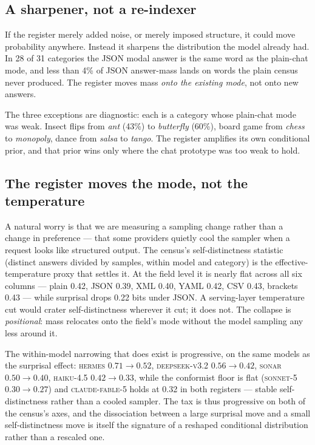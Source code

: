 \documentclass[11pt]{article}
\begin{document}
\subsection{A sharpener, not a re-indexer}
\label{sec:sharpener}
If the register merely added noise, or merely imposed structure, it could move probability
anywhere. Instead it sharpens the distribution the model already had. In 28 of 31 categories the
JSON modal answer is the same word as the plain-chat mode, and less than 4\% of JSON
answer-mass lands on words the plain census never produced. The register moves mass
\emph{onto the existing mode}, not onto new answers.

The three exceptions are diagnostic: each is a category whose plain-chat mode was weak. Insect
flips from \emph{ant} (43\%) to \emph{butterfly} (60\%), board game from \emph{chess} to
\emph{monopoly}, dance from \emph{salsa} to \emph{tango}. The register amplifies its own
conditional prior, and that prior wins only where the chat prototype was too weak to hold.

\subsection{The register moves the mode, not the temperature}
\label{sec:temperature}
A natural worry is that we are measuring a sampling change rather than a change in preference ---
that some providers quietly cool the sampler when a request looks like structured output. The
census's self-distinctness statistic (distinct answers divided by samples, within model and
category) is the effective-temperature proxy that settles it. At the field level it is nearly
flat across all six columns --- plain 0.42, JSON 0.39, XML 0.40, YAML 0.42, CSV 0.43, brackets
0.43 --- while surprisal drops 0.22 bits under JSON. A serving-layer temperature cut would
crater self-distinctness wherever it cut; it does not. The collapse is \emph{positional}: mass
relocates onto the field's mode without the model sampling any less around it.

The within-model narrowing that does exist is progressive, on the same models as the surprisal
effect: \textsc{hermes} $0.71\to0.52$, \textsc{deepseek-v3.2} $0.56\to0.42$, \textsc{sonar}
$0.50\to0.40$, \textsc{haiku-4.5} $0.42\to0.33$, while the conformist floor is flat
(\textsc{sonnet-5} $0.30\to0.27$) and \textsc{claude-fable-5} holds at 0.32 in both registers ---
stable self-distinctness rather than a cooled sampler. The tax is thus progressive on both of the
census's axes, and the dissociation between a large surprisal move and a small self-distinctness
move is itself the signature of a reshaped conditional distribution rather than a rescaled one.
\end{document}
